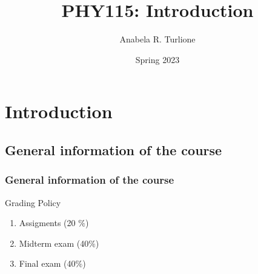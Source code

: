 \documentclass[]{beamer}
\title{PHY115: Introduction}    %
\author{Anabela R. Turlione}                 %
\institute{Digipen}      %
\date{Spring 2023}                    %
\begin{document}
\begin{frame}
  \titlepage
\end{frame}

\section[]{}

\begin{frame}
  \tableofcontents
\end{frame}



\section{Introduction}
\subsection{General information of the course}

\begin{frame}
  \frametitle{General information of the course}
  
Grading Policy %

\vspace{5 mm}

  \begin{enumerate}
   \item  	Assigments (20 $\%$)
   \item   Midterm exam (40$\%$)
   \item 	Final exam (40$\%$)
  \end{enumerate}
\end{frame}
\end{document}
